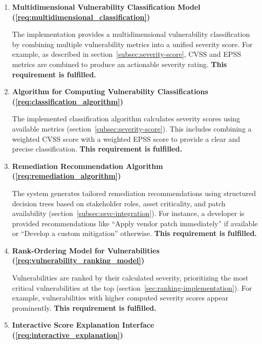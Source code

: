 \begin{enumerate}
			
    \item \textbf{Multidimensional Vulnerability Classification Model (\ref{req:multidimensional_classification})}
    
    The implementation provides a multidimensional vulnerability classification by combining multiple vulnerability metrics into a unified severity score. For example, as described in section~\ref{subsec:severity-score}, \ac{CVSS} and \ac{EPSS} metrics are combined to produce an actionable severity rating. \textbf{This requirement is fulfilled.}
	      	      
    \item \textbf{Algorithm for Computing Vulnerability Classifications (\ref{req:classification_algorithm})}
    
    The implemented classification algorithm calculates severity scores using available metrics (section~\ref{subsec:severity-score}). This includes combining a weighted \ac{CVSS} score with a weighted \ac{EPSS} score to provide a clear and precise classification. \textbf{This requirement is fulfilled.}
	      	      
    \item \textbf{Remediation Recommendation Algorithm (\ref{req:remediation_algorithm})}
    
    The system generates tailored remediation recommendations using structured decision trees based on stakeholder roles, asset criticality, and patch availability (section~\ref{subsec:ssvc-integration}). For instance, a developer is provided recommendations like \enquote{Apply vendor patch immediately} if available or \enquote{Develop a custom mitigation} otherwise. \textbf{This requirement is fulfilled.}
	      
    \newpage
	                
    \item \textbf{Rank-Ordering Model for Vulnerabilities (\ref{req:vulnerability_ranking_model})}
    
    Vulnerabilities are ranked by their calculated severity, prioritizing the most critical vulnerabilities at the top (section~\ref{sec:ranking-implementation}). For example, vulnerabilities with higher computed severity scores appear prominently. \textbf{This requirement is fulfilled.}
	      	      
    \item \textbf{Interactive Score Explanation Interface (\ref{req:interactive_explanation})}
    

\end{enumerate}
